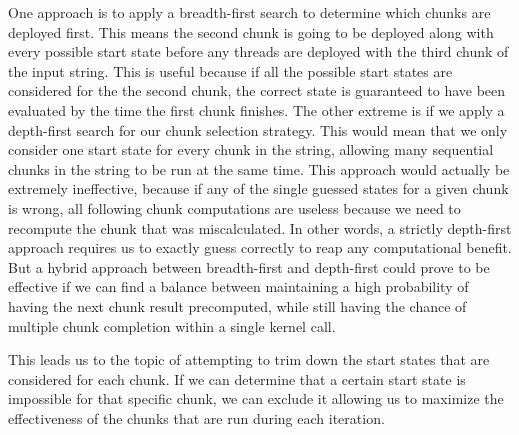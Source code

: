 \documentclass[11pt]{sigplanconf}
\begin{document}
One approach is to apply a breadth-first search to determine which chunks are deployed first. This means the second chunk is going to be deployed along with every possible start state before any threads are deployed with the third chunk of the input string. This is useful because if all the possible start states are considered for the the second chunk, the correct state is guaranteed to have been evaluated by the time the first chunk finishes. The other extreme is if we apply a depth-first search for our chunk selection strategy. This would mean that we only consider one start state for every chunk in the string, allowing many sequential chunks in the string to be run at the same time. This approach would actually be extremely ineffective, because if any of the single guessed states for a given chunk is wrong, all following chunk computations are useless because we need to recompute the chunk that was miscalculated. In other words, a strictly depth-first approach requires us to exactly guess correctly to reap any computational benefit. But a hybrid approach between breadth-first and depth-first could prove to be effective if we can find a balance between maintaining a high probability of having the next chunk result precomputed, while still having the chance of multiple chunk completion within a single kernel call.

This leads us to the topic of attempting to trim down the start states that are considered for each chunk. If we can determine that a certain start state is impossible for that specific chunk, we can exclude it allowing us to maximize the effectiveness of the chunks that are run during each iteration.







%




\end{document}
